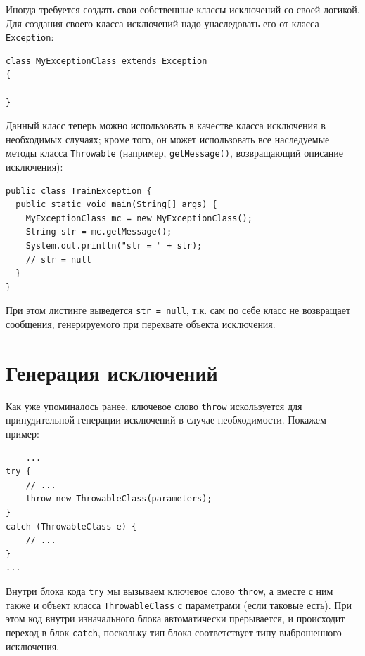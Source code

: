 \documentclass{report}
\begin{document}
Иногда требуется создать свои собственные классы исключений со своей логикой. Для создания своего класса исключений надо унаследовать его от класса \verb|Exception|:

\begin{lstlisting}
class MyExceptionClass extends Exception
{

}
\end{lstlisting}

Данный класс теперь можно использовать в качестве класса исключения в необходимых случаях; кроме того, он может использовать все наследуемые методы класса \verb|Throwable| (например, \verb|getMessage()|, возвращающий описание исключения):

\begin{lstlisting}
public class TrainException {
  public static void main(String[] args) {
    MyExceptionClass mc = new MyExceptionClass();
    String str = mc.getMessage();
    System.out.println("str = " + str);
    // str = null
  }
}
\end{lstlisting}

При этом листинге выведется \verb|str = null|, т.к. сам по себе класс не возвращает сообщения, генерируемого при перехвате объекта исключения.

\section{Генерация исключений}

Как уже упоминалось ранее, ключевое слово \verb|throw| искользуется для принудительной генерации исключений в случае необходимости. Покажем пример:

\begin{lstlisting}
    ...
try {
    // ...
    throw new ThrowableClass(parameters);
}
catch (ThrowableClass e) {
    // ...
}
...
\end{lstlisting}

Внутри блока кода \verb|try| мы вызываем ключевое слово \verb|throw|, а вместе с ним также и объект класса \verb|ThrowableClass| с параметрами (если таковые есть). При этом код внутри изначального блока автоматически прерывается, и происходит переход в блок \verb|catch|, поскольку тип блока соответствует типу выброшенного исключения.
\end{document}
